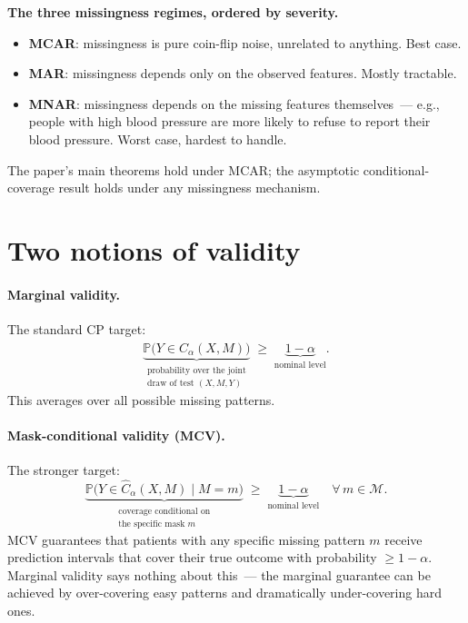 \documentclass[letterpaper,11pt,leqno]{article}
\begin{document}
\begin{definitionexplain}
\textbf{The three missingness regimes, ordered by severity.}
\begin{itemize}
\item \textbf{MCAR}: missingness is pure coin-flip noise, unrelated to anything. Best case.
\item \textbf{MAR}: missingness depends only on the observed features. Mostly tractable.
\item \textbf{MNAR}: missingness depends on the missing features themselves~--- e.g., people with high blood pressure are more likely to refuse to report their blood pressure. Worst case, hardest to handle.
\end{itemize}
The paper's main theorems hold under MCAR; the asymptotic conditional-coverage result holds under any missingness mechanism.
\end{definitionexplain}

\section{Two notions of validity}\label{s:construction}

\paragraph{Marginal validity.} The standard CP target:
\begin{equation*}
\underbrace{\mathbb{P}\bigl(Y \in \hat{C}_{\alpha}(X, M)\bigr)}_{\substack{\text{probability over the joint}\\\text{draw of test } (X, M, Y)}}
\;\geq\;
\underbrace{1 - \alpha}_{\text{nominal level}}.
\end{equation*}
This averages over all possible missing patterns.

\paragraph{Mask-conditional validity (MCV).} The stronger target:
\begin{equation*}
\underbrace{\mathbb{P}\bigl(Y \in \hat{C}_{\alpha}(X, M) \mid M = m\bigr)}_{\substack{\text{coverage conditional on}\\\text{the specific mask } m}}
\;\geq\;
\underbrace{1 - \alpha}_{\text{nominal level}}
\quad \forall\, m \in \mathcal{M}.
\end{equation*}
MCV guarantees that patients with any specific missing pattern $m$ receive prediction intervals that cover their true outcome with probability $\geq 1 - \alpha$. Marginal validity says nothing about this~--- the marginal guarantee can be achieved by over-covering easy patterns and dramatically under-covering hard ones.
\end{document}
